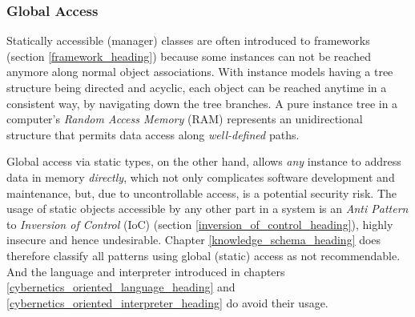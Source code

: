 %
%
%
%
%
%
%

\subsubsection{Global Access}
\label{global_access_heading}

Statically accessible (manager) classes are often introduced to frameworks
(section \ref{framework_heading}) because some instances can not be reached
anymore along normal object associations. With instance models having a tree
structure being directed and acyclic, each object can be reached anytime in a
consistent way, by navigating down the tree branches. A pure instance tree in a
computer's \emph{Random Access Memory} (RAM) represents an unidirectional
structure that permits data access along \emph{well-defined} paths.

Global access via static types, on the other hand, allows \emph{any} instance
to address data in memory \emph{directly}, which not only complicates software
development and maintenance, but, due to uncontrollable access, is a potential
security risk. The usage of static objects accessible by any other part in a
system is an \emph{Anti Pattern} to \emph{Inversion of Control} (IoC) (section
\ref{inversion_of_control_heading}), highly insecure and hence undesirable.
Chapter \ref{knowledge_schema_heading} does therefore classify all patterns
using global (static) access as not recommendable. And the language and
interpreter introduced in chapters \ref{cybernetics_oriented_language_heading}
and \ref{cybernetics_oriented_interpreter_heading} do avoid their usage.
